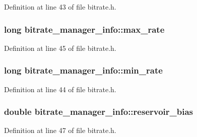 Definition at line 43 of file bitrate.\+h.

\subsubsection[{\texorpdfstring{max\+\_\+rate}{max_rate}}]{\setlength{\rightskip}{0pt plus 5cm}long bitrate\+\_\+manager\+\_\+info\+::max\+\_\+rate}\hypertarget{structbitrate__manager__info_a8694ec6266069b0e3521793ecd4e59d2}{}\label{structbitrate__manager__info_a8694ec6266069b0e3521793ecd4e59d2}


Definition at line 45 of file bitrate.\+h.

\subsubsection[{\texorpdfstring{min\+\_\+rate}{min_rate}}]{\setlength{\rightskip}{0pt plus 5cm}long bitrate\+\_\+manager\+\_\+info\+::min\+\_\+rate}\hypertarget{structbitrate__manager__info_a70b89ca96ddf87dc93eac879429c0d5d}{}\label{structbitrate__manager__info_a70b89ca96ddf87dc93eac879429c0d5d}


Definition at line 44 of file bitrate.\+h.

\subsubsection[{\texorpdfstring{reservoir\+\_\+bias}{reservoir_bias}}]{\setlength{\rightskip}{0pt plus 5cm}double bitrate\+\_\+manager\+\_\+info\+::reservoir\+\_\+bias}\hypertarget{structbitrate__manager__info_a7e3ab7c2b92ee477615a6308952f3005}{}\label{structbitrate__manager__info_a7e3ab7c2b92ee477615a6308952f3005}


Definition at line 47 of file bitrate.\+h.

